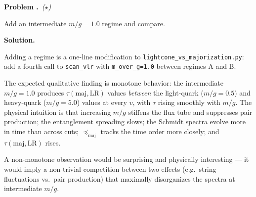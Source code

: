 \documentclass[11pt,a4paper]{article}
\newcounter{problem}
\newenvironment{problem}[1][]{%
  \refstepcounter{problem}%
  \par\medskip\noindent
  \textbf{Problem \theproblem.}\if\relax\detokenize{#1}\relax\else\ \textit{(#1)}\fi\quad\ignorespaces
}{\par\smallskip}
\newenvironment{solution}{%
  \par\noindent\textbf{Solution.}\quad\ignorespaces
}{\par\medskip}
\newcommand{\maj}{\mathrm{maj}}
\newcommand{\LR}{\mathrm{LR}}
\newcommand{\preceqmaj}{\preceq_{\maj}}
\begin{document}
\begin{problem}[$\star$]
Add an intermediate $m/g = 1.0$ regime and compare.
\end{problem}

\begin{solution}
Adding a regime is a one-line modification to \texttt{lightcone\_vs\_majorization.py}:
add a fourth call to \texttt{scan\_vlr} with \texttt{m\_over\_g=1.0}
between regimes A and B.

The expected qualitative finding is monotone behavior: the
intermediate $m/g = 1.0$ produces $\tau(\maj, \LR)$ values
\emph{between} the light-quark ($m/g = 0.5$) and heavy-quark
($m/g = 5.0$) values at every $v$, with $\tau$ rising smoothly with
$m/g$.  The physical intuition is that increasing $m/g$ stiffens
the flux tube and suppresses pair production; the entanglement
spreading slows; the Schmidt spectra evolve more in time than across
cuts; $\preceqmaj$ tracks the time order more closely; and
$\tau(\maj, \LR)$ rises.

A non-monotone observation would be surprising and physically
interesting --- it would imply a non-trivial competition between
two effects (e.g.\ string fluctuations vs.\ pair production) that
maximally disorganizes the spectra at intermediate $m/g$.
\end{solution}
\end{document}
